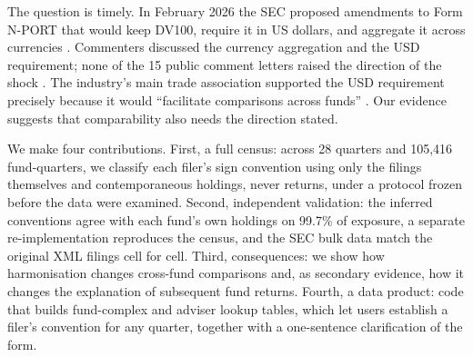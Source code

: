 \documentclass[11pt]{article}
\begin{document}
The question is timely. In February 2026 the SEC proposed amendments to Form N-PORT that would keep
DV100, require it in US dollars, and aggregate it across currencies \citep{sec_proposal}. Commenters
discussed the currency aggregation and the USD requirement; none of the 15 public comment letters
raised the direction of the shock \citep{sec_comments}. The industry's main trade association
supported the USD requirement precisely because it would ``facilitate comparisons across funds''
\citep{ici_letter}. Our evidence suggests that comparability also needs the direction stated.

We make four contributions. First, a full census: across 28 quarters and 105,416 fund-quarters, we
classify each filer's sign convention using only the filings themselves and contemporaneous
holdings, never returns, under a protocol frozen before the data were examined. Second, independent
validation: the inferred conventions agree with each fund's own holdings on 99.7\% of exposure, a
separate re-implementation reproduces the census, and the SEC bulk data match the original XML
filings cell for cell. Third, consequences: we show how harmonisation changes cross-fund comparisons
and, as secondary evidence, how it changes the explanation of subsequent fund returns. Fourth, a data
product: code that builds fund-complex and adviser lookup tables, which let users establish a filer's convention for any
quarter, together with a one-sentence clarification of the form.
\end{document}
